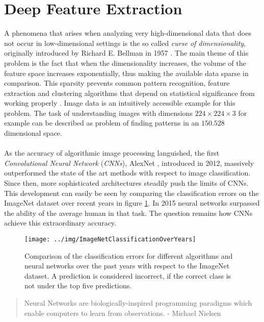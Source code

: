 \section{Deep Feature Extraction}
\label{sec:DeepFeatureExtraction}
A phenomena that arises when analyzing very high-dimensional data that does not occur in low-dimensional settings is the so called \textit{curse of dimensionality}, originally introduced by Richard E. Bellman in 1957 \cite{CurseOfDimensionality}. The main theme of this problem is the fact that when the dimensionality increases, the volume of the feature space increases exponentially, thus making the available data sparse in comparison. This sparsity prevents common pattern recognition, feature extraction and clustering algorithms that depend on statistical significance from working properly \cite{DataClustering}. Image data is an intuitively accessible example for this problem. The task of understanding images with dimensions $224 \times 224 \times 3$ for example can be described as problem of finding patterns in an $150.528$ dimensional space. \\
\\
As the accuracy of algorithmic image processing languished, the first \textit{Convolutional Neural Network} (\textit{CNNs}), AlexNet \cite{Alexnet}, introduced in 2012, massively outperformed the state of the art methods with respect to image classification. Since then, more sophisticated architectures steadily push the limits of CNNs. This development can easily be seen by comparing the classification errors on the ImageNet \cite{ILSVRC} dataset over recent years in figure \ref{fig:ImageNetClassificationOverYears}. In 2015 neural networks surpassed the ability of the average human in that task. The question remains how CNNs achieve this extraordinary accuracy. 
\begin{figure}[H]
\texttt{[image: ../img/ImageNetClassificationOverYears]}
\caption{Comparison of the classification errors for different algorithms and neural networks over the past years with respect to the ImageNet \cite{ILSVRC} dataset. A prediction is considered incorrect, if the correct class is not under the top five predictions. \cite{CNNComparison}}
\label{fig:ImageNetClassificationOverYears}
\end{figure}
\begin{quote}
\glqq Neural Networks are biologically-inspired programming paradigms which enable computers to learn from observations.\grqq\; - Michael Nielsen \cite{nielsenneural}
\end{quote}
